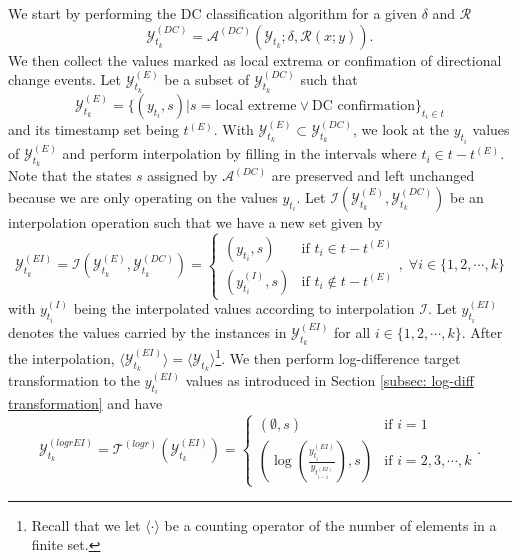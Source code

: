 We start by performing the DC classification algorithm for a given $\delta$ and $\mathcal{R}$
\begin{equation*}
    \mathcal{Y}^{(DC)}_{t_k} = \mathcal{A}^{(DC)} (\mathcal{Y}_{t_k}; \delta, \mathcal{R} (x; y)).
\end{equation*}
We then collect the values marked as local extrema or confimation of directional change events. Let $\mathcal{Y}^{(E)}_{t_k}$ be a subset of $\mathcal{Y}^{(DC)}_{t_k}$ such that
\begin{equation*}
    \mathcal{Y}^{(E)}_{t_k} = \{(y_{t_i}, s) | s = \text{local extreme} \vee \text{DC confirmation} \}_{t_i \in t}
\end{equation*}
and its timestamp set being $t^{(E)}$. With $\mathcal{Y}^{(E)}_{t_k} \subset \mathcal{Y}^{(DC)}_{t_k}$, we look at the $y_{t_i}$ values of $\mathcal{Y}^{(E)}_{t_k}$ and perform interpolation by filling in the intervals where $t_i \in t - t^{(E)}$. Note that the states $s$ assigned by $\mathcal{A}^{(DC)}$ are preserved and left unchanged because we are only operating on the values $y_{t_i}$. Let $\mathcal{I} (\mathcal{Y}^{(E)}_{t_k}, \mathcal{Y}^{(DC)}_{t_k})$ be an interpolation operation such that we have a new set given by
\begin{equation*}
    \mathcal{Y}^{(EI)}_{t_k} = \mathcal{I} (\mathcal{Y}^{(E)}_{t_k}, \mathcal{Y}^{(DC)}_{t_k}) = \begin{cases}
        (y_{t_i}, s)          &\text{if $t_i \in t - t^{(E)}$} \\
        (y^{(I)}_{t_i}, s)    &\text{if $t_i \notin t - t^{(E)}$}
    \end{cases}, \; \forall i \in \{1, 2, \cdots, k\}
\end{equation*}
with $y^{(I)}_{t_i}$ being the interpolated values according to interpolation $\mathcal{I}$. Let $y^{(EI)}_{t_i}$ denotes the values carried by the instances in $\mathcal{Y}^{(EI)}_{t_k}$ for all $i \in \{ 1, 2, \cdots, k\}$. After the interpolation, $\langle \mathcal{Y}^{(EI)}_{t_k} \rangle = \langle \mathcal{Y}_{t_k} \rangle$\footnote{Recall that we let $\langle \cdot \rangle$ be a counting operator of the number of elements in a finite set.}.
We then perform log-difference target transformation to the $y^{(EI)}_{t_i}$ values as introduced in Section \ref{subsec: log-diff transformation} and have
\begin{equation*}
    \mathcal{Y}^{(logrEI)}_{t_k} = \mathcal{T}^{(logr)}(\mathcal{Y}^{(EI)}_{t_k}) = \begin{cases}
        (\emptyset, s)  &\text{if $i = 1$} \\
        (\log(\frac{y^{(EI)}_{t_i}}{y_{t^{(EI)}_{i-1}}}), s) &\text{if $i = 2, 3, \cdots, k$}
    \end{cases}.
\end{equation*}
